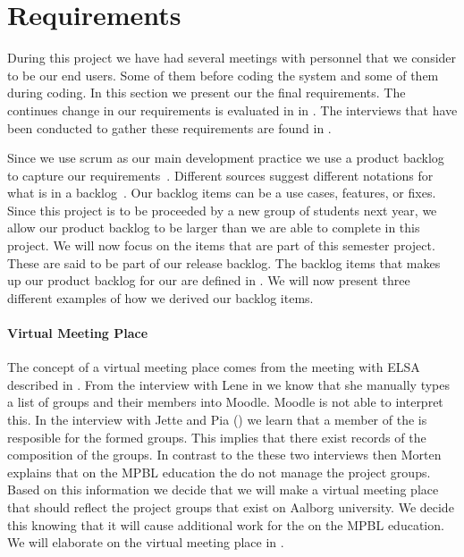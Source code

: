 \section{Requirements}
\label{sec:requirements}
During this project we have had several meetings with personnel that we consider to be our end users.
Some of them before coding the system and some of them during coding.
In this section we present our the final requirements.
The continues change in our requirements is evaluated in  in .
The interviews that have been conducted to gather these requirements are found in .

Since we use scrum as our main development practice we use a product backlog to capture our requirements~\cite[p.~114]{Larman04}.
Different sources suggest different notations for what is in a backlog~\cite[p.~17]{scrumchecklist}\cite[pp.~123-124]{Larman04}.
Our backlog items can be a use cases, features, or fixes.
Since this project is to be proceeded by a new group of students next year, we allow our product backlog to be larger than we are able to complete in this project.
We will now focus on the items that are part of this semester project.
These are said to be part of our release backlog.
The backlog items that makes up our product backlog for our \subsystem{} are defined in .
We will now present three different examples of how we derived our backlog items.

\paragraph{Virtual Meeting Place}
The concept of a virtual meeting place comes from the meeting with ELSA described in . 
From the interview with Lene in  we know that she manually types a list of groups and their members into Moodle.
Moodle is not able to interpret this. 
In the interview with Jette and Pia () we learn that a member of the \admpers{} is resposible for the formed groups. 
This implies that there exist records of the composition of the groups.   
In contrast to the these two interviews then Morten explains that on the MPBL education the \admpers{} do not manage the project groups.
Based on this information we decide that we will make a virtual meeting place that should reflect the project groups that exist on Aalborg university. 
We decide this knowing that it will cause additional work for the \admpers{} on the MPBL education. 
We will elaborate on the virtual meeting place in .


